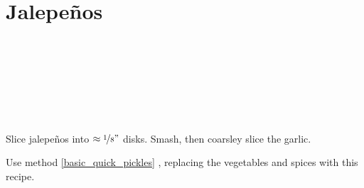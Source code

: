 \section{Jalepe\~{n}os}


\begin{ingredientcolumns}[1]
	\begin{ingredientblock}
		\\
		\\
		\\
		\\
		\\
		\\
	\end{ingredientblock}
\end{ingredientcolumns}


\begin{preparation}
\item Slice jalepe\~{n}os into $\approx \nicefrac{1}{8} "$ disks.
	Smash, then coarsley slice the garlic.

\item Use method \ref{basic_quick_pickles} , replacing the vegetables and spices with this recipe.
\end{preparation}


\recipeend
